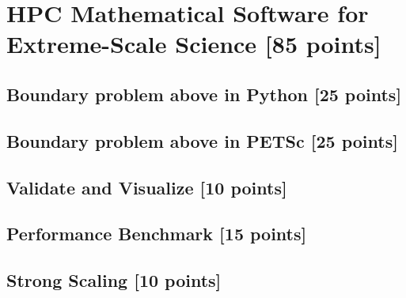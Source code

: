 \documentclass[unicode,11pt,a4paper,oneside,numbers=endperiod,openany]{scrartcl}
\begin{document}
\setassignment

\newline

\assignmentpolicy


\section{HPC Mathematical Software for Extreme-Scale Science  [85 points]}

\subsection{Boundary problem above in Python [25 points]}

\subsection{Boundary problem above in PETSc [25 points]}

\subsection{Validate and Visualize [10 points]}

\subsection{Performance Benchmark [15 points]}
                     
\subsection{Strong Scaling [10 points]}

\end{document}
